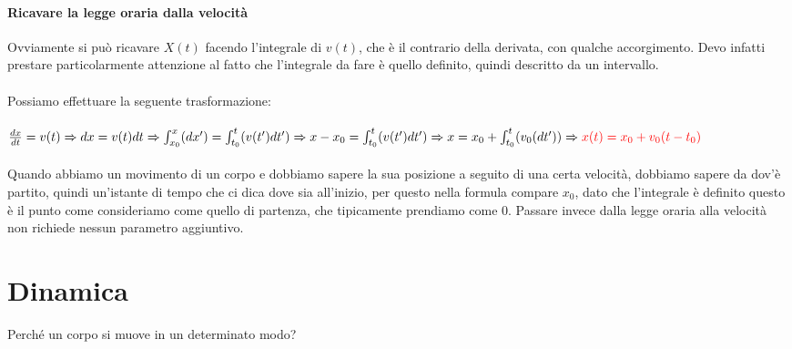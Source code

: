 \documentclass[a4paper,12pt]{report}
\begin{document}
	\subsubsection{Ricavare la legge oraria dalla velocità}
	Ovviamente si può ricavare $X(t)$ facendo l'integrale di $v(t)$, che è il contrario della derivata, con qualche accorgimento. Devo infatti prestare particolarmente attenzione al fatto che l'integrale da fare è quello definito, quindi descritto da un intervallo.\\\\
	Possiamo effettuare la seguente trasformazione:\\\\
	${\frac{dx}{dt} = v(t)}\Rightarrow\\{{dx} = {v(t)dt}} \Rightarrow\\{\int_{x_0}^{x}(dx')} = {\int_{t_0}^{t}(v(t')dt')} \Rightarrow\\{x-x_0} = {\int_{t_0}^{t}(v(t')dt')}\Rightarrow\\{x} = {x_0} + {\int_{t_0}^{t}(v_0(dt'))} \Rightarrow \mathcolor{red}{{x(t) = x_0 + v_0(t-t_0)}}$\\\\
	Quando abbiamo un movimento di un corpo e dobbiamo sapere la sua posizione a seguito di una certa velocità, dobbiamo sapere da dov'è partito, quindi un'istante di tempo che ci dica dove sia all'inizio, per questo nella formula compare $x_0$, dato che l'integrale è definito questo è il punto come consideriamo come quello di partenza, che tipicamente prendiamo come $0$. Passare invece dalla legge oraria alla velocità non richiede nessun parametro aggiuntivo.
	\chapter{Dinamica}
	Perché un corpo si muove in un determinato modo?
\end{document}
